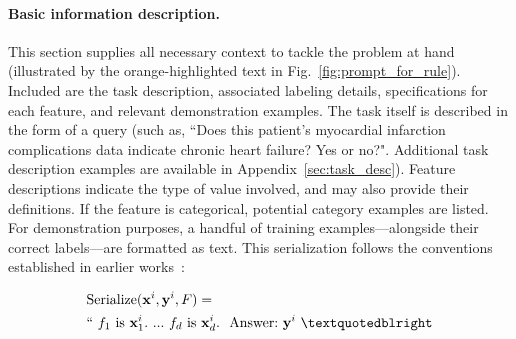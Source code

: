 \vspace*{-0.12in}
\paragraph{Basic information description.} This section supplies all necessary context to tackle the problem at hand (illustrated by the orange-highlighted text in Fig.~\ref{fig:prompt_for_rule}). Included are the task description, associated labeling details, specifications for each feature, and relevant demonstration examples. The task itself is described in the form of a query (such as, ``Does this patient's myocardial infarction complications data indicate chronic heart failure? Yes or no?". Additional task description examples are available in Appendix~\ref{sec:task_desc}). Feature descriptions indicate the type of value involved, and may also provide their definitions. If the feature is categorical, potential category examples are listed. For demonstration purposes, a handful of training examples—alongside their correct labels—are formatted as text. This serialization follows the conventions established in earlier works~\cite{dinh2022lift,hegselmann2023tabllm}:

\begin{align}
&\text{Serialize}(\mathbf{x}^i,\mathbf{y}^i, F) = \nonumber \\ 
&``\ f_1\ \text{is}\ \mathbf{x}^i_1.\ ... \ f_d\  \text{is}\  \mathbf{x}^i_d.\ \ \text{Answer:}\  \mathbf{y}^i\ ”
\end{align}

\vspace*{-0.12in}
